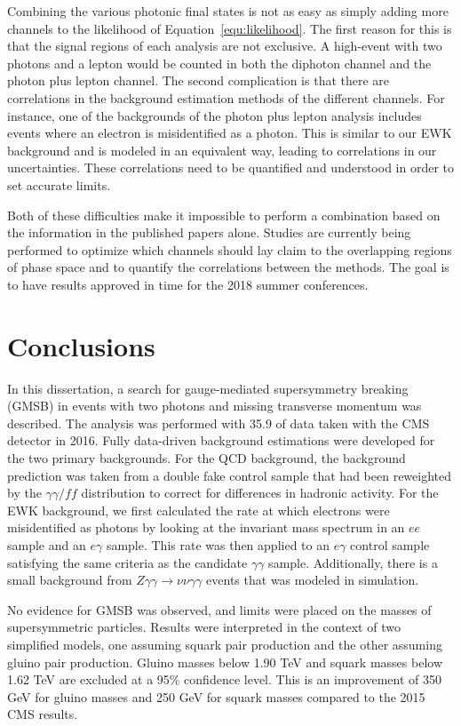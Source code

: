 Combining the various photonic final states is not as easy as simply adding more 
channels to the likelihood of Equation~\ref{equ:likelihood}. The first reason for this is
that the signal regions of each analysis are not exclusive. A high-\ETmiss event with two photons 
and a lepton would be counted in both the diphoton channel and the photon plus lepton channel.
The second complication is that there are correlations
in the background estimation methods of the different channels.
For instance, one of the backgrounds of the 
photon plus lepton analysis includes events where an electron is misidentified as a photon.
This is similar to our EWK background and is modeled in an equivalent way, leading to 
correlations in our uncertainties. These correlations need to be quantified and understood 
in order to set accurate limits.

Both of these difficulties 
make it impossible to perform a combination based on the information 
in the published papers alone.
Studies are currently being performed to optimize which channels should
lay claim to the overlapping regions of phase space 
and to quantify the correlations between the methods. The goal is to have
results approved in time for the 2018 summer conferences.

\section{Conclusions}
\label{sec:conclusions}
In this dissertation, a search for gauge-mediated supersymmetry breaking (GMSB) in events with two photons and missing transverse momentum was described. The analysis was performed with 35.9 \fbinv of data taken with the CMS detector in 2016. Fully data-driven background estimations were developed for the two primary backgrounds. For the QCD background, the background prediction was taken from a double fake control sample that had been reweighted by the $\gamma\gamma/ff$ \diempt distribution to correct for differences in hadronic activity. For the EWK background, we first calculated the rate at which electrons were misidentified as photons by looking at the invariant mass spectrum in an $ee$ sample and an $e\gamma$ sample. This rate was then applied to an $e\gamma$ control sample satisfying the same criteria as the candidate $\gamma\gamma$ sample. Additionally, there is a small background from $Z\gamma\gamma\rightarrow\nu\nu\gamma\gamma$ events that was modeled in simulation. 

No evidence for GMSB was observed, and limits were placed on the masses of supersymmetric particles. Results were interpreted in the context of two simplified models, one assuming squark pair production and the other assuming gluino pair production. Gluino masses below 1.90 TeV and squark masses below 1.62 TeV are excluded at a 95\% confidence level. This is an improvement of 350 GeV for gluino masses and 250 GeV for squark masses compared to the 2015 CMS results.